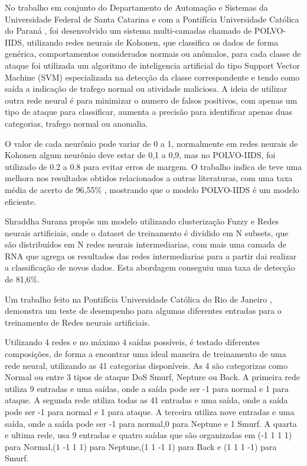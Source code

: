 \documentclass[
	12pt,				%
	openright,			%
	oneside,
	a4paper,			%
	english,			%
	french,				%
	spanish,			%
	brazil				%
	]{abntex2}
\begin{document}
No trabalho em conjunto do Departamento de Automação e Sistemas da Universidade Federal de Santa Catarina \cite{polvo1} e com a Pontifícia Universidade Católica do Paraná \cite{polvo2}, foi desenvolvido um sistema multi-camadas chamado de POLVO-IIDS, utilizando redes neurais de Kohonen, que classifica os dados de forma genérica, comportamentos considerados normais ou anômalos, para cada classe de ataque foi utilizada um algoritmo de inteligencia artificial do tipo Support Vector Machine (SVM) especializada na detecção da classe correspondente e tendo como saída a indicação de trafego normal ou atividade maliciosa.
A ideia de utilizar outra rede neural é para minimizar o numero de falsos positivos, com apenas um tipo de ataque para classificar, aumenta a precisão para identificar apenas duas categorias, trafego normal ou anomalia.

O valor de cada neurônio pode variar de 0 a 1, normalmente em redes neurais de Kohonen algum neurônio deve estar de 0,1 a 0,9, mas no POLVO-IIDS, foi utilizado de 0.2 a 0.8 para evitar erros de margem. 
O trabalho indica de teve uma melhora nos resultados obtidos relacionados a outras literaturas, com uma taxa média de acerto de 96,55\% , mostrando que o modelo POLVO-IIDS é um modelo eficiente.

Shraddha Surana propôs um modelo \cite{Surana} utilizando clusterização Fuzzy e Redes neurais artificiais, onde o dataset de treinamento é dividido em N subsets, que são distribuídos em N redes neurais intermediarias, com mais uma camada de RNA que agrega os resultados das redes intermediarias para a partir dai realizar a classificação de novos dados. Esta abordagem conseguiu uma taxa de detecção de 81,6\%.



Um trabalho feito na Pontifícia Universidade Católica do Rio de Janeiro \cite{RenatoMaia}, demonstra um teste de desempenho para algumas diferentes entradas para o treinamento de Redes neurais artificiais.

Utilizando 4 redes e no máximo 4 saídas possíveis, é testado diferentes composições, de forma a encontrar uma ideal maneira de treinamento de uma rede neural, utilizando as 41 categorias disponíveis.
As 4 são categorizas como Normal ou entre 3 tipos de ataque DoS Smurf, Nepture ou Back.
A primeira rede utiliza 9 entradas e uma saídas, onde a saída pode ser -1 para normal e 1 para ataque.
A segunda rede utiliza todas as 41 entradas e uma saída, onde a saída pode ser -1 para normal e 1 para ataque.
A terceira utiliza nove entradas e uma saída, onde a saída pode ser -1 para normal,0 para Neptune e 1 Smurf.
A quarta e ultima rede, usa 9 entradas e quatro saídas que são organizadas em (-1 1 1 1) para Normal,(1 -1 1 1) para Neptune,(1 1 -1 1) para Back e (1 1 1 -1) para Smurf.
\end{document}
